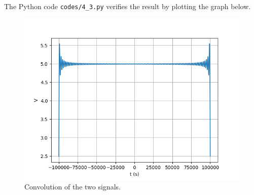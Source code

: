 \documentclass[journal,12pt,twocolumn]{IEEEtran}
\renewcommand\thesection{\arabic{section}}
\begin{document}
\begin{enumerate}[label=\thesection.\arabic*
,ref=\thesection.\theenumi]
\solution The Python code \texttt{codes/4\_3.py} verifies the result
by plotting the graph below.
\begin{figure}[!ht]
    \includegraphics[width=\columnwidth]{figs/4_3.png}
    \caption{Convolution of the two signals.}
    \label{eq:fig-conv}
\end{figure}
\end{enumerate}
\end{document}
